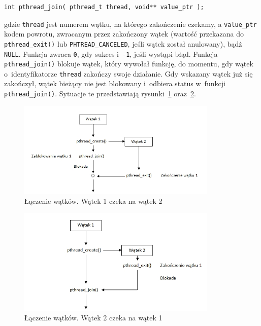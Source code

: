\begin{lstlisting}[style=MyCStyle]
int pthread_join( pthread_t thread, void** value_ptr );
\end{lstlisting}

gdzie \lstinline[style=MyCStyle]{thread} jest numerem wątku, na którego zakończenie czekamy, a \lstinline[style=MyCStyle]{value_ptr} kodem powrotu, zwracanym przez zakończony wątek (wartość przekazana do \lstinline[style=MyCStyle]{pthread_exit()} lub \lstinline[style=MyCStyle]{PHTREAD_CANCELED}, jeśli wątek został anulowany), bądź \lstinline[style=MyCStyle]{NULL}. Funkcja zwraca \lstinline[style=MyCStyle]{0}, gdy sukces i~\lstinline[style=MyCStyle]{-1}, jeśli wystąpi błąd. Funkcja \lstinline[style=MyCStyle]{pthread_join()} blokuje wątek, który wywołał funkcję, do momentu, gdy wątek o~identyfikatorze \lstinline[style=MyCStyle]{thread} zakończy swoje działanie. Gdy wskazany wątek już się zakończył, wątek bieżący nie jest blokowany i~odbiera status w~funkcji \lstinline[style=MyCStyle]{pthread_join()}. Sytuacje te przedstawiają rysunki~\ref{fig:laczenie1} oraz~\ref{fig:laczenie2}.

\begin{figure}[!h]
\centering
\includegraphics[width=0.85\textwidth]{img/laczenie1}
\caption{Łączenie wątków. Wątek 1 czeka na wątek 2}
\label{fig:laczenie1}
\end{figure}
\begin{figure}[!h]
\centering
\includegraphics[width=0.85\textwidth]{img/laczenie2}
\caption{Łączenie wątków. Wątek 2 czeka na wątek 1}
\label{fig:laczenie2}
\end{figure}

